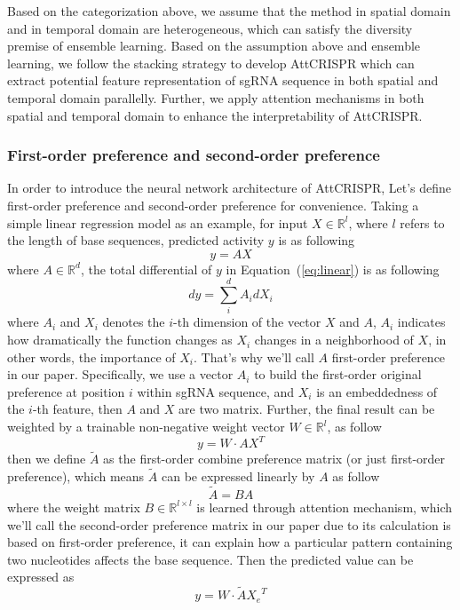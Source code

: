 \documentclass{bioinfo}
\begin{document}
Based on the categorization above, we assume that the method in spatial domain and in temporal domain are heterogeneous, 
which can satisfy the diversity premise of ensemble learning. 
Based on the assumption above and ensemble learning, we follow the stacking strategy to develop AttCRISPR 
which can extract potential feature representation of sgRNA sequence in both spatial and temporal domain parallelly. 
Further, we apply attention mechanisms in both spatial and temporal domain to enhance the interpretability of AttCRISPR.

\subsubsection{First-order preference and second-order preference}

In order to introduce the neural network architecture of AttCRISPR, Let's define first-order preference and second-order preference for convenience. 
Taking a simple linear regression model as an example, for input $X\in\mathbb{R}^l$, where $l$ refers to the length of base sequences, predicted activity $y$ is as following
\begin{equation}
y = AX\label{eq:linear}
\end{equation}
where $A \in\mathbb{R}^d$, the total differential of $y$ in Equation~(\ref{eq:linear}) is as following
\begin{equation}
dy = \sum^{d}_iA_idX_i\label{eq:02}
\end{equation}
where $A_i$ and $X_i$ denotes the $i$-th dimension of the vector $X$ and $A$, 
$A_i$ indicates how dramatically the function changes as $X_i$ changes in a neighborhood of $X$, 
in other words, the importance of $X_i$. 
That's why we'll call $A$ first-order preference in our paper. 
Specifically, we use a vector $A_i$ to build the first-order original preference at position $i$ within sgRNA sequence, 
and $X_i$ is an embeddedness of the $i$-th feature, then $A$ and $X$ are two matrix. 
Further, the final result can be weighted by a trainable non-negative weight vector $W\in\mathbb{R}^l$, as follow
\begin{equation}
y=W \cdot AX^{T}\label{eq:superlinear}
\end{equation}
then we define $\tilde{A}$ as the first-order combine preference matrix (or just first-order preference), which means $\tilde{A}$ can be expressed linearly by $A$ as follow
\begin{equation}
\tilde{A}=BA\label{eq:04}
\end{equation}
where the weight matrix $B\in\mathbb{R}^{l\times l}$ is learned through attention mechanism, 
which we'll call the second-order preference matrix in our paper due to its calculation is based on first-order preference, 
it can explain how a particular pattern containing two nucleotides affects the base sequence. 
Then the predicted value can be expressed as
\begin{equation}
y=W \cdot \tilde{A} {X_e}^{T}\label{eq:05}
\end{equation}
\end{document}
